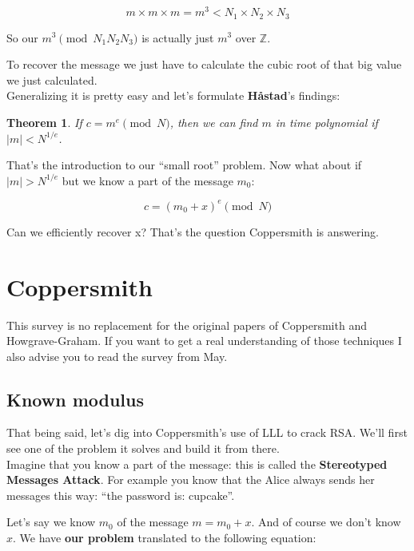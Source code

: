 \documentclass[a4paper,11pt]{article}
\newtheorem{theorem}{Theorem}
\begin{document}
\[ m \times m \times m = m^3 < N_1 \times N_2 \times N_3 \]

So our $m^3 \pmod{N_1 N_2 N_3}$ is actually just $m^3$ over $\mathbb{Z}$. 

To recover the message we just have to calculate the cubic root of that big value we just calculated.\\

Generalizing it is pretty easy and let's formulate \textbf{Håstad}'s findings:

\begin{theorem}
If $c = m^e \pmod{N}$, then we can find $m$ in time polynomial if $|m| < N^{1/e}$.
\end{theorem}

That's the introduction to our ``small root'' problem. Now what about if $|m| > N^{1/e}$ but we know a part of the message $m_0$:

\[ c = (m_0 + x)^e \pmod{N} \]

Can we efficiently recover x? That's the question Coppersmith is answering.




\section{Coppersmith}\label{coppersmith}

This survey is no replacement for the original papers of Coppersmith\cite{coppersmith} and Howgrave-Graham\cite{howgrave-graham}. If you want to get a real understanding of those techniques I also advise you to read the survey from May\cite{may}.

\subsection{Known modulus}\label{knownmodulus}

That being said, let's dig into Coppersmith's use of LLL to crack RSA. We'll first see one of the problem it solves and build it from there.\\
Imagine that you know a part of the message: this is called the \textbf{Stereotyped Messages Attack}. For example you know that the Alice always sends her messages this way: ``the password is: cupcake''.

Let's say we know $m_0$ of the message $m = m_0 + x$. And of course we don't know $x$. We have \textbf{our problem} translated to the following equation:
\end{document}
